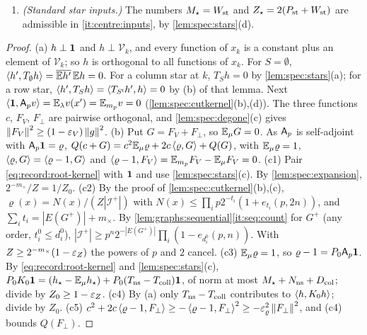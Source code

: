 \begin{proposition}
\begin{enumerate}[label=\textup{(\alph*)}]
\begin{enumerate}[label=\textup{(c\arabic*)}]
  \item\label{it:centre:sup} $\sup_{\mathcal I^+}\varrho\le R_+:=\dfrac{\prod_{i=1}^n\big(1+e_{t_i}(p,2n)\big)}
    {(1-\eps_Z)\prod_{i\in U^+}\big(1-e_{d^0_i}(p,n)\big)}$, with the deletion degrees $t_i$.
  \item\label{it:centre:rho} $\norm{\varrho-1}_\mu=\norm{P_0\Op\one}_\mu\le\eps_\varrho$.
  \item\label{it:centre:perp} $|\ip h{\Op h}_\mu|\le R_Z(N_{\rm ns}+D_{\rm col})\norm h^2_\mu$ for
    $h\in\mathcal H_\perp$.
  \item\label{it:centre:cperp} $c^2+2c\ip{\varrho-1}{F_\perp}_\mu+Q(F_\perp)\ge-c_\perp r\norm{F_\perp}^2_\mu$
    with $c_\perp=\big(R_Z(N_{\rm ns}+D_{\rm col})+\eps_\varrho^2\big)/r$.
  \end{enumerate}
\item\label{it:centre:standard} \emph{(Standard star inputs.)} The numbers
  $M_\star=W_{\rm st}$ and $Z_\star=2(P_{\rm st}+W_{\rm st})$ are admissible in
  \ref{it:centre:inputs}, by \cref{lem:spec:stars}(d).
\end{enumerate}
\end{proposition}

\begin{proof}
(a) $h\perp\mathbf 1$ and $h\perp\mathcal V_k$, and every function of $x_k$ is a constant plus
an element of $\mathcal V_k$; so $h$ is orthogonal to all functions of $x_k$. For
$S=\emptyset$, $\left\langle h',T_\emptyset h\right\rangle=\overline{\mathbb E h'}\,\mathbb E h=0$. For a column star at $k$,
$T_Sh=0$ by \cref{lem:spec:stars}(a); for a row star,
$\left\langle h',T_Sh\right\rangle=\left\langle T_{S^{\mathsf t}}h',h\right\rangle=0$ by (b) of that lemma. Next
$\left\langle \mathbf 1,\mathsf A_p v\right\rangle=\mathbb E_\lambda v(x')=\mathbb E_{m_p}v=0$ (\cref{lem:spec:cutkernel}(b),(d)). The
three functions $c$, $F_V$, $F_\perp$ are pairwise orthogonal, and
\cref{lem:spec:degone}(c) gives $\left\|F_V\right\|^2\ge(1-\varepsilon_V)\left\|g\right\|^2$.
(b) Put $G=F_V+F_\perp$, so $\mathbb E_\mu G=0$. As $\mathsf A_p$ is self-adjoint with $\mathsf A_p\mathbf 1=\varrho$,
$Q(c+G)=c^2\mathbb E_\mu\varrho+2c\left\langle \varrho,G\right\rangle+Q(G)$, with $\mathbb E_\mu\varrho=1$,
$\left\langle \varrho,G\right\rangle=\left\langle \varrho-1,G\right\rangle$ and $\left\langle \varrho-1,F_V\right\rangle=\mathbb E_{m_p}F_V-\mathbb E_\mu F_V=0$.
(c1) Pair \eqref{eq:record:root-kernel} with $\mathbf 1$ and use
\cref{lem:spec:stars}(c). By \cref{lem:spec:expansion}, $2^{-m_\times}/Z=1/Z_0$.
(c2) By the proof of \cref{lem:spec:cutkernel}(b),(c),
$\varrho(x)=N(x)/(Z|\mathcal I^+|)$ with
$N(x)\le\prod_ip2^{-t_i}(1+e_{t_i}(p,2n))$, and $\sum_it_i=|E(G^+)|+m_\times$. By
\cref{lem:graphs:sequential}\ref{it:seq:count} for $G^+$ (any order, $t^0_i\le d^0_i$),
$|\mathcal I^+|\ge p^n2^{-|E(G^+)|}\prod_i(1-e_{d^0_i}(p,n))$. With $Z\ge2^{-m_\times}(1-\varepsilon_Z)$
the powers of $p$ and $2$ cancel.
(c3) $\mathbb E_\mu\varrho=1$, so $\varrho-1=P_0\mathsf A_p\mathbf 1$. By \eqref{eq:record:root-kernel} and
\cref{lem:spec:stars}(c),
$P_0K_0\mathbf 1=(h_\star-\mathbb E_\mu h_\star)+P_0(T_{\rm ns}-T_{\rm coll})\mathbf 1$, of norm at most
$M_\star+N_{\rm ns}+D_{\rm col}$; divide by $Z_0\ge1-\varepsilon_Z$.
(c4) By (a) only $T_{\rm ns}-T_{\rm coll}$ contributes to $\left\langle h,K_0h\right\rangle$; divide by $Z_0$.
(c5) $c^2+2c\left\langle \varrho-1,F_\perp\right\rangle\ge-\left\langle \varrho-1,F_\perp\right\rangle^2\ge-\varepsilon_\varrho^2\left\|F_\perp\right\|^2$, and
(c4) bounds $Q(F_\perp)$.
\end{proof}

